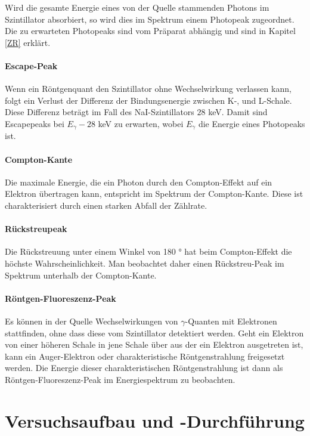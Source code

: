 \documentclass[12pt,listof=totoc]{scrartcl}
\begin{document}
 Wird die gesamte Energie eines von der Quelle stammenden Photons im Szintillator absorbiert, so wird dies im Spektrum einem Photopeak zugeordnet. Die zu erwarteten Photopeaks sind vom Präparat abhängig und sind in Kapitel \ref{ZR} erklärt.
 \paragraph{Escape-Peak}
 Wenn ein Röntgenquant den Szintillator ohne Wechselwirkung verlassen kann, folgt ein Verlust der Differenz der Bindungsenergie zwischen K-, und L-Schale. Diese Differenz beträgt im Fall des NaI-Szintillators $28$ keV. Damit sind Escapepeaks bei $E_\gamma - 28$ keV zu erwarten, wobei $E_\gamma$ die Energie eines Photopeaks ist.

 \paragraph{Compton-Kante}
 Die maximale Energie, die ein Photon durch den Compton-Effekt auf ein Elektron übertragen kann, entspricht im Spektrum der Compton-Kante. Diese ist charakterisiert durch einen starken Abfall der Zählrate.
 
 \paragraph{Rückstreupeak}
 
 Die Rückstreuung unter einem Winkel von 180 ° hat beim Compton-Effekt die höchste Wahrscheinlichkeit.
 Man beobachtet daher einen Rückstreu-Peak im Spektrum unterhalb der Compton-Kante.

 
 \paragraph{Röntgen-Fluoreszenz-Peak}
Es können in der Quelle Wechselwirkungen von $\gamma$-Quanten mit Elektronen stattfinden, ohne dass diese vom Szintillator detektiert werden. Geht ein Elektron von einer höheren Schale in jene Schale über aus der ein Elektron ausgetreten ist, kann ein Auger-Elektron oder charakteristische Röntgenstrahlung freigesetzt werden. Die Energie dieser charakteristischen Röntgenstrahlung ist dann als Röntgen-Fluoreszenz-Peak im Energiespektrum zu beobachten.




\newpage
\section{Versuchsaufbau und -Durchführung}
\end{document}
